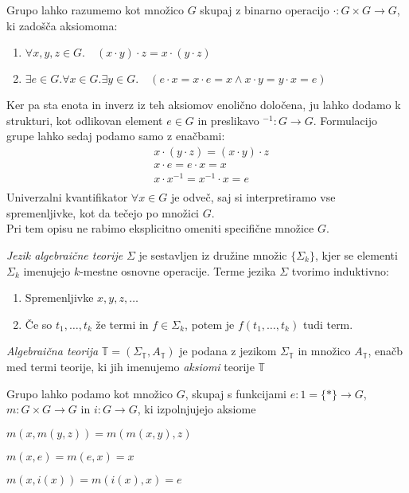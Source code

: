 \documentclass[../kategoricna_logika.tex]{subfiles}
\begin{document}
\begin{primer}
Grupo lahko razumemo kot množico $G$ skupaj z binarno operacijo $\cdot : G \times G \to G$, ki zadošča aksiomoma:
%
\begin{enumerate}
\item $\forall x,y,z \in G . \quad (x\cdot y) \cdot z = x \cdot (y \cdot z)$
\item $\exists e \in G . \forall x \in G . \exists y \in G . \quad (e \cdot x = x \cdot e = x \wedge x \cdot y = y \cdot x = e)$
\end{enumerate}
\end{primer}
Ker pa sta enota in inverz iz teh aksiomov enolično določena, ju lahko dodamo k strukturi, kot odlikovan element $e \in G$ in preslikavo $^{-1} : G \to G$.
%
Formulacijo grupe lahko sedaj podamo samo z enačbami:
\vspace{1em}
\begin{align*}
&x \cdot (y \cdot z) = (x \cdot y) \cdot z \\
&x \cdot e = e \cdot x = x \\
&x \cdot x^{-1} = x^{-1} \cdot x = e \\
\end{align*}
Univerzalni kvantifikator $\forall x \in G$ je odveč, saj si interpretiramo vse spremenljivke, kot da tečejo po množici $G$. \\
Pri tem opisu ne rabimo eksplicitno omeniti specifične množice $G$.
%
\begin{definicija}
\emph{Jezik algebraične teorije} $\Sigma$ je sestavljen iz družine množic $\lbrace \Sigma_k \rbrace$, kjer se elementi $\Sigma_k$ imenujejo $k$-mestne osnovne operacije. Terme jezika $\Sigma$ tvorimo induktivno:
\begin{enumerate}
\item Spremenljivke $x,y,z, \ldots$
\item Če so $t_1, \ldots, t_k$ že termi in $f \in \Sigma_k$, potem je $f(t_1,\ldots, t_k)$ tudi term.
\end{enumerate}
\end{definicija}
%
\begin{definicija}
\emph{Algebraična teorija} $\mathbb{T} = (\Sigma_\mathbb{T}, A_\mathbb{T})$ je podana z jezikom $\Sigma_\mathbb{T}$ in množico $A_\mathbb{T}$, enačb med termi teorije, ki jih imenujemo \emph{aksiomi} teorije $\mathbb{T}$
\end{definicija}
%
\begin{primer}
Grupo lahko podamo kot množico $G$, skupaj s funkcijami $e : 1 = \lbrace * \rbrace \to G$, $m : G \times G \to G$ in $i : G \to G$, ki izpolnjujejo aksiome
\begin{description}
\item $m(x,m(y,z)) = m(m(x,y),z)$
\item $m(x,e) = m(e,x) = x$
\item $m(x,i(x)) = m(i(x),x) = e$
\end{description}
\end{primer}
\end{document}
